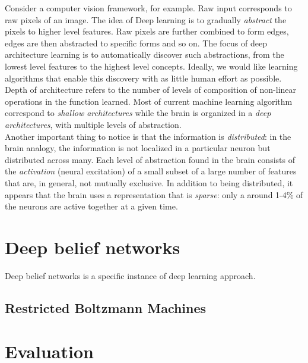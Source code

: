 Consider a computer vision framework, for example. Raw input corresponds to raw pixels of an image. The idea of Deep learning is to gradually \textit{abstract} the pixels to higher level features. Raw pixels are further combined to form edges, edges are then abstracted to specific forms and so on. The focus of deep architecture learning is to automatically discover such abstractions, from the lowest level features to the highest level concepts. Ideally, we would like learning algorithms that enable this discovery with as little human effort as possible. \\

Depth of architecture refers to the number of levels of composition of non-linear operations in the function learned. Most of current machine learning algorithm correspond to \textit{shallow architectures} while the brain is organized in a \textit{deep architectures}, with multiple levels of abstraction. \\

Another important thing to notice is that the information is \textit{distributed}: in the brain analogy, the information is not localized in a particular neuron but distributed across many. Each level of abstraction found in the brain consists of the \textit{activation} (neural excitation) of a small subset of a large number of features that are, in general, not mutually exclusive. In addition to being distributed, it appears that the brain uses a representation that is \textit{sparse}: only a around 1-4\% of the neurons are active together at a given time.


\section{Deep belief networks}

Deep belief networks is a specific instance of deep learning approach.

\subsection{Restricted Boltzmann Machines}






\section{Evaluation}

